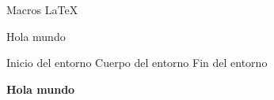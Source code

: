 \documentclass{article}
\begin{document}
Macros LaTeX

\newcommand{\hola}{Hola mundo}
\hola

\newenvironment{mientorno}{Inicio del entorno}{Fin del entorno}
\begin{mientorno}
  Cuerpo del entorno
\end{mientorno}








\textbf{Hola mundo}



\begin{multicols}{2}
  \lipsum[1]
\end{multicols}
\end{document}
